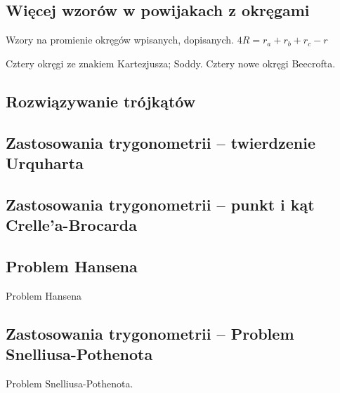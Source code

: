 \subsection{Więcej wzorów w powijakach z okręgami}
Wzory na promienie okręgów wpisanych, dopisanych.
$4R = r_a + r_b + r_c - r$ %

Cztery okręgi ze znakiem Kartezjusza; Soddy.
Cztery nowe okręgi Beecrofta.
%

\subsection{Rozwiązywanie trójkątów}


\subsection{Zastosowania trygonometrii -- twierdzenie Urquharta}


\subsection{Zastosowania trygonometrii -- punkt i kąt Crelle'a-Brocarda}


\subsection{Problem Hansena}
Problem Hansena
%

\subsection{Zastosowania trygonometrii -- Problem Snelliusa-Pothenota}
Problem Snelliusa-Pothenota.
%




